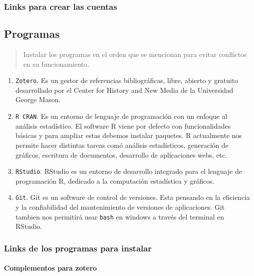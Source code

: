 \subsubsection{Links para crear las cuentas}\label{links-para-crear-las-cuentas}

\subsection{Programas}\label{programas}

\begin{quote}
Instalar los programas en el orden que se mencionan para evitar conflictos en su funcionamiento.
\end{quote}

\begin{enumerate}
\def\labelenumi{\arabic{enumi}.}
\item
  \texttt{Zotero}. Es un gestor de referencias bibliográficas, libre, abierto y gratuito desarrollado por el Center for History and New Media de la Universidad George Mason.
\item
  \texttt{R\ CRAN}. Es un entorno de lenguaje de programación con un enfoque al análisis estadístico. El software R viene por defecto con funcionalidades básicas y para ampliar estas debemos instalar paquetes. R actualmente nos permite hacer distintas tareas comó análisis estadísticos, generación de gráficos, escritura de documentos, desarrollo de aplicaciones webs, etc.
\item
  \texttt{RStudio}. RStudio es un entorno de desarrollo integrado para el lenguaje de programación R, dedicado a la computación estadística y gráficos.
\item
  \texttt{Git}. Git es un software de control de versiones. Esta pensando en la eficiencia y la confiabilidad del mantenimiento de versiones de aplicaciones. Git tambien nos permitirá usar \texttt{bash} en windows a través del terminal en RStudio.
\end{enumerate}

\subsubsection{Links de los programas para instalar}\label{links-de-los-programas-para-instalar}

\paragraph{Complementos para zotero}\label{complementos-para-zotero}


